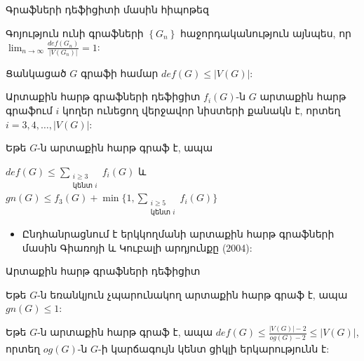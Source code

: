\begin{frame}{Գրաֆների դեֆիցիտի մասին հիպոթեզ}
\begin{theorem}
Գոյություն ունի գրաֆների $\left\{G_n\right\}$ հաջորդականություն այնպես, որ $\lim_{n \rightarrow \infty}{\frac{def(G_n)}{|V(G_n)|}} = 1$:
\end{theorem}

\begin{hypothesis}
Ցանկացած $G$ գրաֆի համար $def(G) \leq |V(G)|$:
\end{hypothesis}
\end{frame}


\begin{frame}[shrink]{Արտաքին հարթ գրաֆների դեֆիցիտ}
$f_i(G)$-ն $G$ արտաքին հարթ գրաֆում $i$ կողեր ունեցող վերջավոր նիստերի քանակն է, որտեղ $i=3,4,\ldots,|V(G)|$:

\begin{theorem}[2.4.15]
Եթե $G$-ն արտաքին հարթ գրաֆ է, ապա 
\begin{center}
$def(G) \leq \sum\limits_{\substack{i\geq 3 \\ \text{կենտ }i}}{f_i(G)}$ և $gn(G) \leq f_3(G) + \min\{1,  \sum\limits_{\substack{i\geq 5 \\ \text{կենտ }i}}{f_{i}(G)} \}$
\end{center}
\end{theorem}

\begin{itemize}
\item Ընդհանրացնում է երկկողմանի արտաքին հարթ գրաֆների մասին Գիառոյի և Կուբալի արդյունքը (2004):
\end{itemize}

\end{frame}


\begin{frame}[shrink]{Արտաքին հարթ գրաֆների դեֆիցիտ}


\begin{corollary}[2.4.17]
Եթե $G$-ն եռանկյուն չպարունակող արտաքին հարթ գրաֆ է, ապա $gn(G) \leq 1$: 
\end{corollary}

\begin{corollary}[2.4.18]
Եթե $G$-ն արտաքին հարթ գրաֆ է, ապա 
$def(G) \leq \frac{|V(G)|-2}{og(G)-2} \leq |V(G)|$,
որտեղ $og(G)$-ն $G$-ի կարճագույն կենտ ցիկլի երկարությունն է:
\end{corollary}
\end{frame}